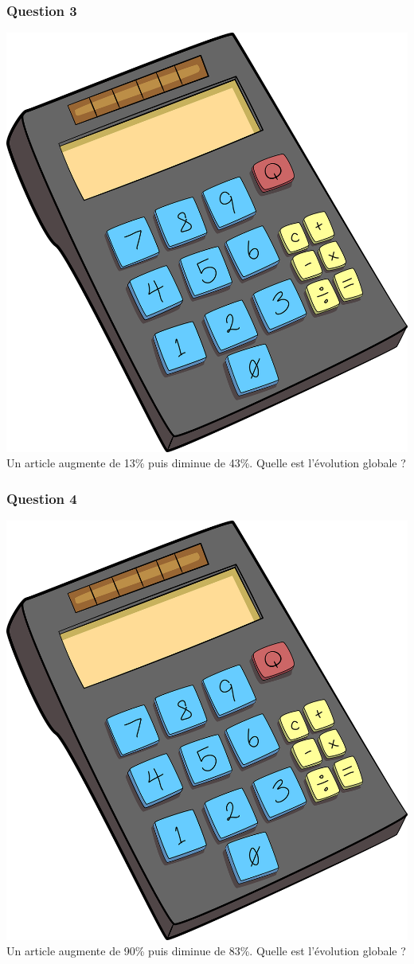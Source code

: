 \documentclass[15pt, mathserif]{beamer}
\begin{document}
\begin{frame} 
	\frametitle{Question 3}
\includegraphics[scale=0.01]{calculatrice} Un article augmente de 13\% puis diminue de 43\%. Quelle est l'évolution globale ?\end{frame}


\begin{frame} 
	\frametitle{Question 4}
\includegraphics[scale=0.01]{calculatrice} Un article augmente de 90\% puis diminue de 83\%. Quelle est l'évolution globale ?\end{frame}
\end{document}
